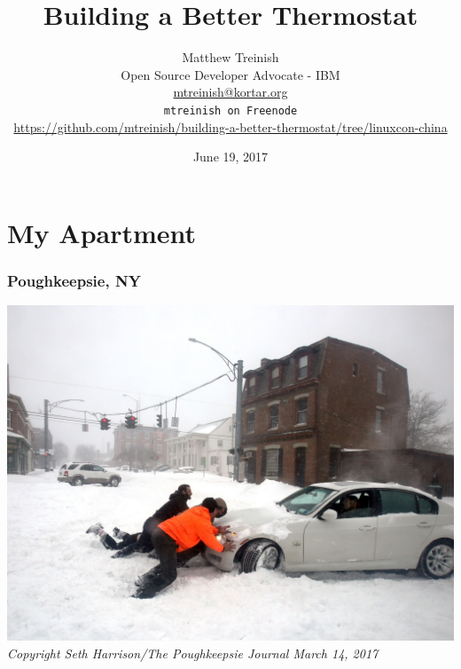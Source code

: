 \documentclass[aspectratio=169,11pt,hyperref={colorlinks=true}]{beamer}
\author[Matthew Treinish]{%
    \texorpdfstring{%
        \centering
        Matthew Treinish\\
        Open Source Developer Advocate - IBM \\
        \href{mailto:mtreinish@kortar.org}{mtreinish@kortar.org}\\
        \texttt{mtreinish on Freenode}\\
        \href{https://github.com/mtreinish/building-a-better-thermostat/tree/linuxcon-china}{https://github.com/mtreinish/building-a-better-thermostat/tree/linuxcon-china}
   }
   {Matthew Treinish}
}
\date{June 19, 2017}
\title{Building a Better Thermostat}
\begin{document}
\titlepage

\section{My Apartment}
\begin{frame}
    \frametitle{Poughkeepsie, NY}
    \begin{center}
        \includegraphics[height=.85\textheight]{snow.jpg}\\
        \footnotesize
        \textit{Copyright Seth Harrison/The Poughkeepsie Journal March 14, 2017}
    \end{center}
\end{frame}
\end{document}
